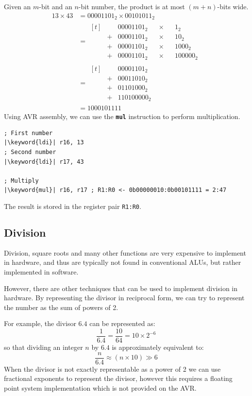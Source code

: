 \documentclass{report}
\newcommand{\keyword}[1]{\textcolor[rgb]{0.00,0.50,0.00}{\textbf{#1}}}
\newcommand{\keywordinline}[1]{\textcolor[rgb]{0.00,0.50,0.00}{\textbf{\texttt{#1}}}}
\begin{document}
Given an \(m\)-bit and an \(n\)-bit number, the product is at most \((m+n)\)-bits wide.
\begin{align*}
    13 \times 43 & = 00001101_2 \times 00101011_2                \\
                 & = \begin{aligned}[t]
                          &   & 00001101_2 &  & \times &  & 1_2      \\
                          & + & 00001101_2 &  & \times &  & 10_2     \\
                          & + & 00001101_2 &  & \times &  & 1000_2   \\
                          & + & 00001101_2 &  & \times &  & 100000_2
                     \end{aligned} \\
                 & = \begin{aligned}[t]
                          &   & 00001101_2  \\
                          & + & 00011010_2  \\
                          & + & 01101000_2  \\
                          & + & 110100000_2
                     \end{aligned}                          \\
                 & = 1000101111
\end{align*}
Using AVR assembly, we can use the \keywordinline{mul} instruction to perform multiplication.
\begin{verbatim}
; First number
|\keyword{ldi}| r16, 13
; Second number
|\keyword{ldi}| r17, 43

; Multiply
|\keyword{mul}| r16, r17 ; R1:R0 <- 0b00000010:0b00101111 = 2:47
\end{verbatim}
The result is stored in the register pair \texttt{R1:R0}.
\subsection{Division}
Division, square roots and many other functions are very expensive to implement in hardware,
and thus are typically not found in conventional ALUs, but rather
implemented in software.

However, there are other techniques that can be used to implement division in hardware.
By representing the divisor in reciprocal form, we can try to represent the number as
the sum of powers of 2.

For example, the divisor \(6.4\) can be represented as:
\begin{equation*}
    \frac{1}{6.4} = \frac{10}{64} = 10 \times 2^{-6}
\end{equation*}
so that dividing an integer \(n\) by \(6.4\) is approximately equivalent to:
\begin{equation*}
    \frac{n}{6.4} \approx \left( n \times 10 \right) \gg 6
\end{equation*}
When the divisor is not exactly representable as a power of 2 we can use fractional
exponents to represent the divisor, however this requires a floating point
system implementation which is not provided on the AVR\@.
\end{document}
